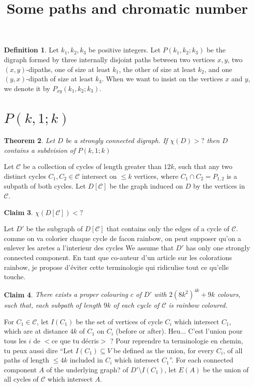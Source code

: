 \documentclass[utf8,10pt]{article}
\title{Some paths and chromatic number}
\theoremstyle{plain}
\newtheorem{theorem}{Theorem}
\newtheorem{claim}[theorem]{Claim}
\theoremstyle{definition}
\newtheorem{definition}[theorem]{Definition}
\theoremstyle{remark}
\newcommand{\william}[1]{{\color{red}{\bf William:} #1}}
\newcommand{\nathann}[1]{{\color{blue}{\bf Nathann:} #1}}
\begin{document}
\begin{definition}
Let $k_1,k_2,k_3$ be positive integers. Let $P(k_1,k_2;k_3)$ be the digraph formed by three internally disjoint paths between two vertices $x,y$, two $(x,y)$-dipaths, one of size at least $k_1$, the other of size at least $k_2$, and one $(y,x)$-dipath of size at least $k_3$.
When we want to insist on the vertices $x$ and $y$, we denote it by $P_{xy}(k_1,k_2;k_3)$.
\end{definition}




\section{$P(k,1;k)$}

\begin{theorem}
Let $D$ be a strongly connected digraph. If $\chi(D) > ?$ then $D$ contains a subdvision of $P(k,1;k)$
\end{theorem}

Let $\mathcal{C}$ be a collection of cycles of length greater than $12k$, such
that any two distinct cycles $C_1,C_2\in\mathcal C$ intersect on $\leq k$
vertices, where $C_1\cap C_2=P_{1,2}$ is a subpath of both cycles.  Let $D[\mathcal{C}]$ be
the graph induced on $D$ by the vertices in $\mathcal{C}$.

\begin{claim}\label{DC}
$\chi(D[\mathcal{C}]) < ? $
\end{claim}

Let $D'$ be the subgraph of $D[\mathcal{C}]$ that contains only the edges of a cycle of  $\mathcal{C}$.
\william{comme on va colorier chaque cycle de facon rainbow, on peut supposer qu'on a enlever les aretes a l'interieur des cycles}
We assume that $D'$ has only one strongly connected component.
\nathann{En tant que co-auteur d'un article sur les colorations rainbow, je propose d'éviter cette terminologie qui ridiculise tout ce qu'elle touche.}


\begin{claim}
There exists a proper colouring $c$ of $D'$ with $2(8k^2)^{4k} + 9k$ colours, such that, each subpath of length $9k$ of each cycle of $\mathcal{C}$ is rainbow coloured.
\end{claim}

For $C_1\in \mathcal{C}$, let $I(C_1)$ be the set of vertices of cycle $C_i$ which intersect $C_1$, which are at distance $4k$
of $C_1$ on $C_i$ (before or after).
\nathann{Heu... C'est l'union pour tous les $i$ de $<$ce que tu décris$>$ ? Pour reprendre ta terminologie en chemin, tu peux aussi dire ``Let $I(C_1)\subseteq V$ be defined as the union, for every $C_i$, of all paths of length $\leq 4k$ included in $C_i$ which intersect $C_1$''.}
For each connected component $A$ \nathann{of the underlying graph?}
of $D'\setminus I(C_1)$, let $E(A)$ be the union of all cycles of $\mathcal{C}$ which intersect $A$.
\end{document}
